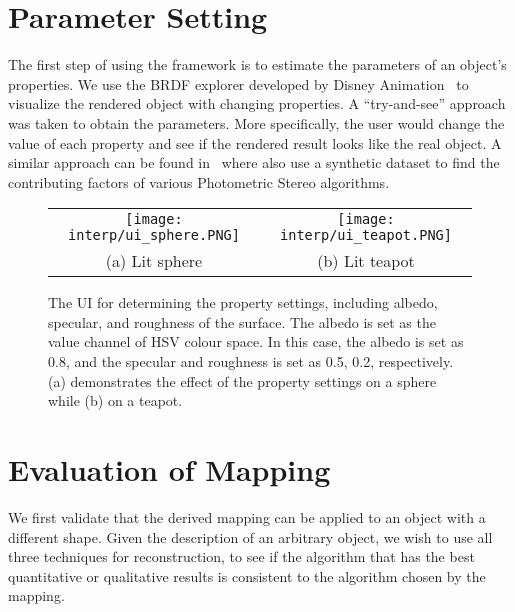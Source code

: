 \section{Parameter Setting}
The first step of using the framework is to estimate the parameters of an object's properties. We use the BRDF explorer developed by Disney Animation~\cite{disnybrdf} to visualize the rendered object with changing properties. A ``try-and-see'' approach was taken to obtain the parameters. More specifically, the user would change the value of each property and see if the rendered result looks like the real object. A similar approach can be found in~\cite{Berkiten:2016:ARB} where \citeauthor{Berkiten:2016:ARB} also use a synthetic dataset to find the contributing factors of various Photometric Stereo algorithms.
\begin{figure}[!htbp]
\centering
\begin{tabular}{cc}
  \texttt{[image: interp/ui\_sphere.PNG]}&
  \texttt{[image: interp/ui\_teapot.PNG]}\\
  (a) Lit sphere & (b) Lit teapot\\
\end{tabular}
\caption{The UI for determining the property settings, including albedo, specular, and roughness of the surface. The albedo is set as the value channel of HSV colour space. In this case, the albedo is set as 0.8, and the specular and roughness is set as 0.5, 0.2, respectively. (a) demonstrates the effect of the property settings on a sphere while (b) on a teapot.}
\label{fig:ui}
\end{figure}

\section{Evaluation of Mapping}
\label{sec:interp_extend}
We first validate that the derived mapping can be applied to an object with a different shape. Given the description of an arbitrary object, we wish to use all three techniques for reconstruction, to see if the algorithm that has the best quantitative or qualitative results is consistent to the algorithm chosen by the mapping.

